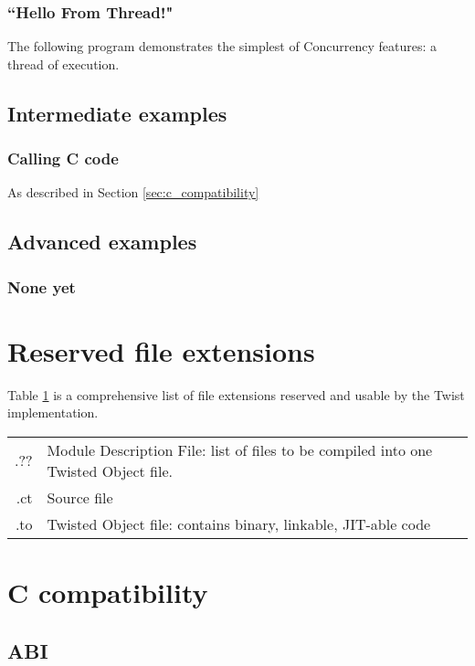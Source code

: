 \documentclass[a4paper,11pt]{report}
\begin{document}
    \subsubsection{``Hello From Thread!"}

The following program demonstrates the simplest of Concurrency features: a thread of execution.

  \subsection{Intermediate examples}
    \subsubsection{Calling C code}

As described in Section \ref{sec:c_compatibility}

  \subsection{Advanced examples}
    \subsubsection{None yet}

\appendix
\section{Reserved file extensions}
Table \ref{tab:file_extensions} is a comprehensive list of file extensions reserved and usable by the Twist implementation.
\begin{table}[h] \label{tab:file_extensions}
\begin{tabular}{r|l}
.?? & Module Description File: list of files to be compiled into one Twisted Object file. \\
.ct & Source file \\
.to & Twisted Object file: contains binary, linkable, JIT-able code
\end{tabular}
\end{table}

\section{C compatibility}
\subsection{ABI}
\end{document}
